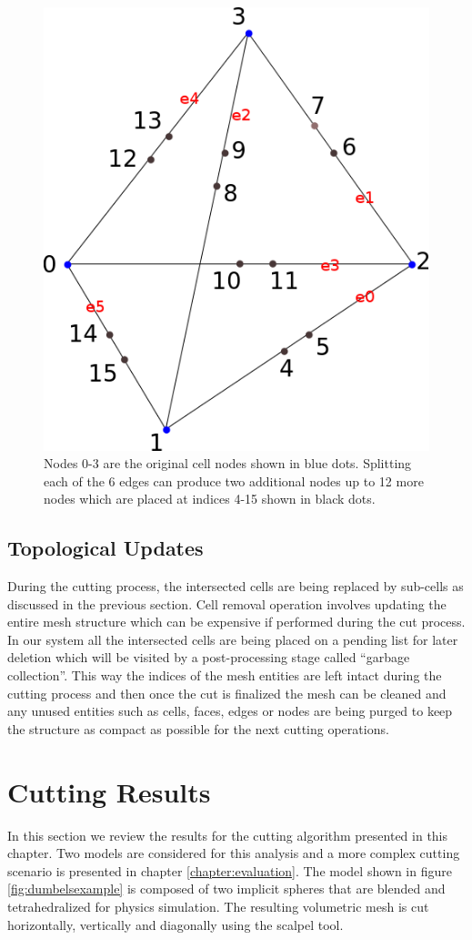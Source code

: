 \begin{figure}[H]
  \centering
  \includegraphics[width=0.4\linewidth]{figures/cutting/midpoints.png}
  \caption{\label{fig:midpoints}
  {Nodes 0-3 are the original cell nodes shown in blue dots. Splitting each of the 6 edges can produce two additional nodes up to 12 more nodes which 
  are placed at indices 4-15 shown in black dots.}
}
\end{figure}

\subsection{Topological Updates}
During the cutting process, the intersected cells are being replaced by sub-cells as discussed in the previous section. Cell removal operation involves updating the entire 
mesh structure which can be expensive if performed during the cut process. In our system all the intersected cells are being placed on a pending list for later deletion 
which will be visited by a post-processing stage called ``garbage collection''. This way the indices of the mesh entities are left intact during the cutting process and 
then once the cut is finalized the mesh can be cleaned and any unused entities such as cells, faces, edges or nodes are being purged to keep the structure as compact as 
possible for the next cutting operations.

\section{Cutting Results}
\label{sec:cutres}
In this section we review the results for the cutting algorithm presented in this chapter. 
Two models are considered for this analysis and a more complex cutting scenario is presented in chapter \ref{chapter:evaluation}.
The model shown in figure \ref{fig:dumbelsexample} is composed of two implicit spheres that are blended and tetrahedralized for 
physics simulation. The resulting volumetric mesh is cut horizontally, vertically and diagonally using the scalpel tool. 

